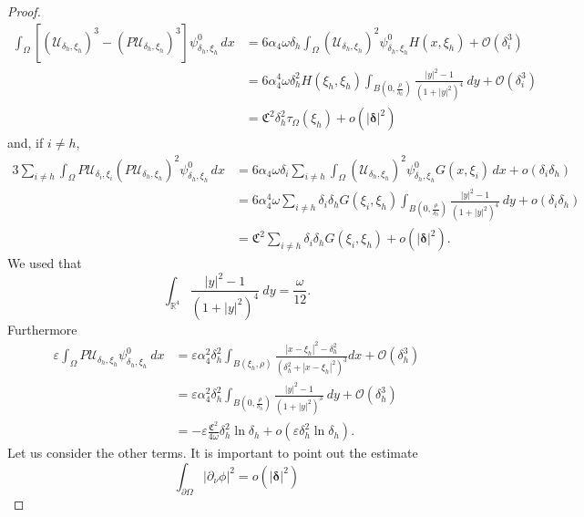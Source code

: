 \documentclass[11pt,a4paper]{amsart}
\newcommand{\e}{\varepsilon}
\renewcommand{\d }{\delta }
\newcommand{\Ui}{{\mathcal{U}_{\delta_i, \xi_i}}}
\newcommand{\Uh}{{\mathcal{U}_{\delta_h, \xi_h}}}
\theoremstyle{definition}
\renewcommand{\(}{\left(}
\renewcommand{\)}{\right)}
\begin{document}
\begin{proof}
\begin{equation*}
\begin{aligned}
\int_{\Omega} \left[ (\Uh)^{3} -(P\Uh)^{3} \right] \psi^0_{\d_h, \xi_h}\, dx & = 6 \alpha_{4} \omega \delta_{h} \int_{\Omega}(\Uh)^2 \psi^0_{\d_h, \xi_h} H(x, \xi_{h}) + \mathcal{O}(\d_i^{3}) \\&= 6 \alpha_{4}^{4} \omega \delta_{h}^{2} H(\xi_{h}, \xi_{h}) \int_{B(0, \frac{\rho}{\d_h})} \frac{|y|^{2}-1}{(1+|y|^{2})^{4}} \ dy + \mathcal{O}(\d_i^{3}) \\& = \mathfrak{C}^{2} \delta_h^2\tau_\Omega(\xi_h) + o(|\pmb\d|^2)
\end{aligned}
\end{equation*}
and, if $i \neq h$,
\begin{equation*}
\begin{aligned}
3 \sum_{i \neq h} \int_{\Omega} P\Ui (P\Uh)^2 \psi^0_{\d_h, \xi_h}\, dx & = 6 \alpha_{4} \omega \delta_{i} \sum_{i \neq h} \int_{\Omega} (\Uh)^2 \psi^0_{\d_h, \xi_h} G(x, \xi_{i})\, dx + o(\d_i \d_h)
\\&= 6 \alpha_{4}^{4} \omega \sum_{i \neq h} \delta_{i} \delta_{h} G(\xi_{i},\xi_{h})  \int_{B(0, \frac{\rho}{\d_h})} \frac{|y|^{2}-1}{(1+|y|^{2})^{4}} \ dy + o(\d_i \d_h) 
\\& = \mathfrak{C}^2 \sum_{i\neq h}\d_i\d_h G(\xi_i, \xi_h) + o(|\pmb \d|^{2}).
\end{aligned}
\end{equation*}
We used that 
\begin{equation*}
\int_{\mathbb{R}^{4}} \frac{|y|^{2}-1}{(1+|y|^{2})^{4}} \ dy = \frac{\omega}{12}.
\end{equation*}
Furthermore
\begin{equation*}
\begin{aligned}
\e \int_{\Omega} P\Uh \psi^0_{\d_h, \xi_h} \ dx & = \e \alpha_4^2 \d_h^2 \int_{B(\xi_h, \rho)} \frac{|x-\xi_h|^{2} - \d_h^2}{(\d_h^2 + |x-\xi_h|^2)^{3}} dx + \mathcal{O}(\d_h^3) \\&
= \e \alpha_{4}^{2} \delta_{h}^{2} \int_{B(0, \frac{\rho}{\delta_{h}})} \frac{|y|^{2}-1}{(1+|y|^{2})^{3}} \ dy + \mathcal{O}(\d_h^3) \\& 
= - \e \frac{\mathfrak{C}^2}{4\omega} \d_h^{2} \ln \d_h + o(\e \d_h^{2}\ln \d_h).
\end{aligned}
\end{equation*}
Let us consider the other terms. It is important to point out the estimate
\begin{equation*}
\int_{\partial \Omega} |\partial_{\nu} \phi|^{2} = o(|\pmb \d|^{2})
\end{equation*}

\end{proof}
\end{document}
